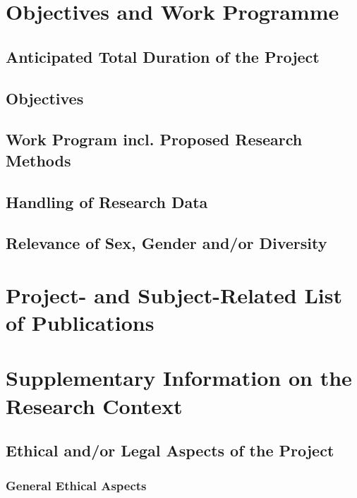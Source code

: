 \documentclass[de]{dfg-proposal}
\begin{document}
\section{Objectives and Work Programme}\label{sec:objectives-and-work-programme}

\subsection{Anticipated Total Duration of the Project}

\subsection{Objectives}

\subsection{Work Program incl. Proposed Research Methods}

\subsection{Handling of Research Data}

\subsection{Relevance of Sex, Gender and/or Diversity}

\section{Project- and Subject-Related List of Publications}\label{sec:bibliography}

\printbibliography

\partbreak

\section{Supplementary Information on the Research Context}\label{sec:begleitinformationen-zum-forschungskontext}

\subsection{Ethical and/or Legal Aspects of the Project}

\subsubsection{General Ethical Aspects}
\end{document}
